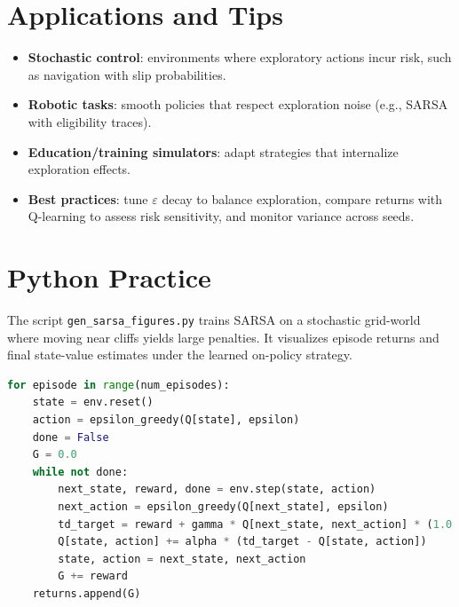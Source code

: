 ﻿\documentclass[12pt]{article}
\begin{document}
\section{Applications and Tips}
\begin{itemize}
  \item \textbf{Stochastic control}: environments where exploratory actions incur risk, such as navigation with slip probabilities.
  \item \textbf{Robotic tasks}: smooth policies that respect exploration noise (e.g., SARSA with eligibility traces).
  \item \textbf{Education/training simulators}: adapt strategies that internalize exploration effects.
  \item \textbf{Best practices}: tune \(\varepsilon\) decay to balance exploration, compare returns with Q-learning to assess risk sensitivity, and monitor variance across seeds.
\end{itemize}

\section{Python Practice}
The script \texttt{gen\_sarsa\_figures.py} trains SARSA on a stochastic grid-world where moving near cliffs yields large penalties. It visualizes episode returns and final state-value estimates under the learned on-policy strategy.
\begin{lstlisting}[language=Python,caption={Excerpt from gen_sarsa_figures.py}]
for episode in range(num_episodes):
    state = env.reset()
    action = epsilon_greedy(Q[state], epsilon)
    done = False
    G = 0.0
    while not done:
        next_state, reward, done = env.step(state, action)
        next_action = epsilon_greedy(Q[next_state], epsilon)
        td_target = reward + gamma * Q[next_state, next_action] * (1.0 - float(done))
        Q[state, action] += alpha * (td_target - Q[state, action])
        state, action = next_state, next_action
        G += reward
    returns.append(G)
\end{lstlisting}
\end{document}
